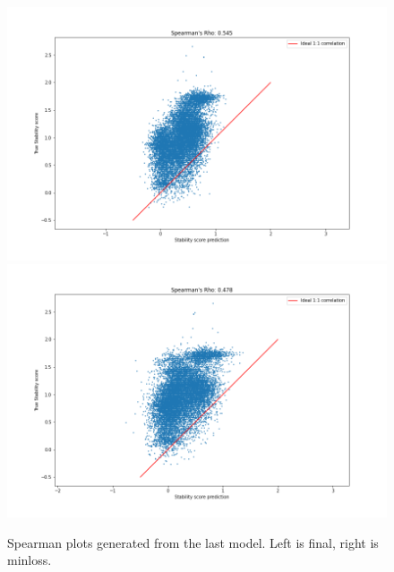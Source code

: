 \begin{figure}[!ht]
  \centering
  \includegraphics[width=0.49\linewidth]{latex/imgs/finished_spearman_final.png}
  \includegraphics[width=0.49\linewidth]{latex/imgs/finished_spearman_minloss.png}
  \caption{Spearman plots generated from the last model. Left is final, right is minloss.}
  \label{fig:finished_spearman}
\end{figure}
